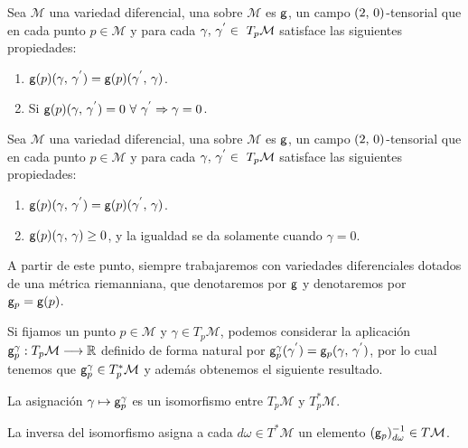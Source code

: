 \begin{definition}
	Sea $\mathcal{M}$ una variedad diferencial, una  sobre $\mathcal{M}$ es $\mathsf{g}$, un campo
	$(2,\thinspace 0)$-tensorial que en cada punto $p\in\mathcal{M}$ y para cada $\gamma\coma\gamma^{'}\in\ T_p\mathcal{M}$ satisface las siguientes propiedades:
	\begin{enumerate}
		\item $\mathsf{g}(p)(\gamma,\thinspace \gamma^{'})=\mathsf{g}(p)(\gamma^{'},\thinspace \gamma)$.
		\item Si $\mathsf{g}(p)(\gamma,\thinspace \gamma^{'})=0\ \forall\ \gamma^{'}\Rightarrow\gamma=0$.
	\end{enumerate}
\end{definition}

\begin{definition}
	Sea $\mathcal{M}$ una variedad diferencial, una  sobre $\mathcal{M}$ es $\mathsf{g}$, un campo
	$(2,\thinspace 0)$-tensorial que en cada punto $p\in\mathcal{M}$ y para cada $\gamma\coma\gamma^{'}\in\ T_p\mathcal{M}$ satisface las siguientes propiedades:
	\begin{enumerate}
		\item $\mathsf{g}(p)(\gamma,\thinspace \gamma^{'})=\mathsf{g}(p)(\gamma^{'},\thinspace \gamma)$.
		\item $\mathsf{g}(p)(\gamma,\thinspace \gamma)\geq 0$, y la igualdad se da solamente cuando $\gamma = 0$.
	\end{enumerate}
\end{definition}

A partir de este punto, siempre trabajaremos con variedades diferenciales dotados de una métrica riemanniana, que denotaremos por $\mathsf{g}$ y
denotaremos por $\mathsf{g}_p=\mathsf{g}(p)$.

Si fijamos un punto $p\in\mathcal{M}$ y $\gamma\in T_p\mathcal{M}$, podemos considerar la aplicación $\mathsf{g}_p^\gamma:T_p\mathcal{M}\longrightarrow \mathbb{R}$ definido
de forma natural por $\mathsf{g}_p^\gamma(\gamma^{'})=\mathsf{g}_p(\gamma,\thinspace\gamma^{'})$, por lo cual tenemos que
$\mathsf{g}_p^\gamma\in T^*_p\mathcal{M}$ y además obtenemos el siguiente resultado.
\begin{proposition}\label{res:metrica-isomorfismo}
La asignación $\gamma\mapsto\mathsf{g}_p^\gamma$ es un isomorfismo entre $T_p\mathcal{M}$ y $T_p^*\mathcal{M}$.
\end{proposition}
La inversa del isomorfismo asigna a cada $d\omega\in T^*\mathcal{M}$ un elemento $(\mathsf{g}_p)^{-1}_{d\omega}\in
T\mathcal{M}$.

